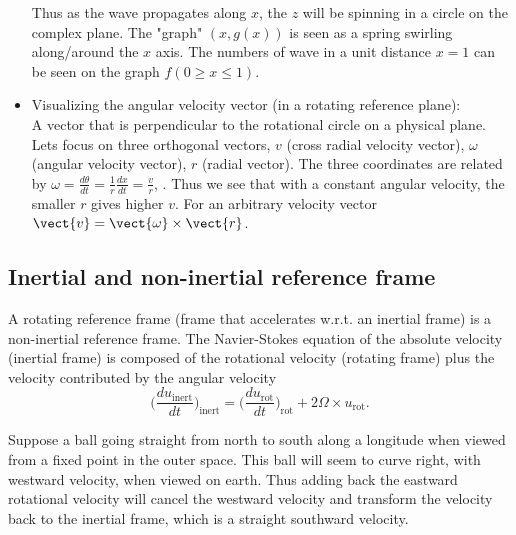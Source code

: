 \begin{itemize}
        Thus as the wave propagates along $x$, the $z$ will be spinning in a circle on the complex plane.
        The "graph" $(x,g(x))$ is seen as a spring swirling along/around the $x$ axis.
        The numbers of wave in a unit distance $x=1$ can be seen on the graph $f(0 \ge x \le 1)$.
    \item Visualizing the angular velocity vector (in a rotating reference plane): \\
        A vector that is perpendicular to the rotational circle on a physical plane. 
        Lets focus on three orthogonal vectors, $v$ (cross radial velocity vector), $\omega$ (angular velocity vector), $r$ (radial vector).
        The three coordinates are related by $\omega = \frac{d\theta}{dt} = \frac{1}{r}\frac{dx}{dt} = \frac{v}{r}$, .
        Thus we see that with a constant angular velocity, the smaller $r$ gives higher $v$.
        For an arbitrary velocity vector $\vect{v} = \vect{\omega} \times \vect{r}$. 
\end{itemize}

\subsection{Inertial and non-inertial reference frame}
A rotating reference frame (frame that accelerates w.r.t. an inertial frame) is a non-inertial reference frame.
The Navier-Stokes equation of the absolute velocity (inertial frame) is composed of the 
rotational velocity (rotating frame) plus the velocity contributed by the angular velocity
\begin{equation}
    \Big(\frac{du_{\text{inert}}}{dt}\Big)_{\text{inert}} = \Big(\frac{du_{\text{rot}}}{dt}\Big)_{\text{rot}} + 2\Omega \times u_{\text{rot}}.
\end{equation}
\begin{exmp}
    Suppose a ball going straight from north to south along a longitude when viewed from a fixed point in the outer space.
    This ball will seem to curve right, with westward velocity, when viewed on earth. 
    Thus adding back the eastward rotational velocity will cancel the westward velocity and 
    transform the velocity back to the inertial frame, which is a straight southward velocity.
\end{exmp}

